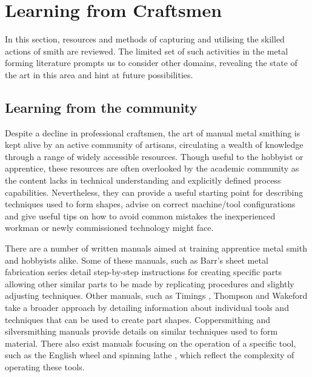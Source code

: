 \newpage
\section{Learning from Craftsmen} \label{sec:Learning}


In this section, resources and methods of capturing and utilising the skilled actions of smith are reviewed. The limited set of such activities in the metal forming literature prompts us to consider other domains, revealing the state of the art in this area and hint at future possibilities. 

\subsection{Learning from the community \label{sec:LfC}}
Despite a decline in professional craftsmen, the art of manual metal smithing is kept alive by an active community of artisans, circulating a wealth of knowledge through a range of widely accessible resources. Though useful to the hobbyist or apprentice, these resources are often overlooked by the academic community as the content lacks in technical understanding and explicitly defined process capabilities. Nevertheless, they can provide a useful starting point for describing techniques used to form shapes, advise on correct machine/tool configurations and give useful tips on how to avoid common mistakes the inexperienced workman or newly commissioned technology might face.

There are a number of written manuals aimed at training apprentice metal smith and hobbyists alike. Some of these manuals, such as Barr's sheet metal fabrication series \citep{Barr2013ProfessionalFabrication,Barr2019SheetProjects} detail step-by-step instructions for creating specific parts allowing other similar parts to be made by replicating procedures and slightly adjusting techniques. Other manuals, such as Timings \citep{Timings2008SheetMetalwork}, Thompson \citep{Thompson2007ManufacturingProfessionals} and Wakeford \citep{Wakeford1985SheetWork} take a broader approach by detailing information about individual tools and techniques that can be used to create part shapes. Coppersmithing \citep{Fuller1904ArtForms} and silversmithing \citep{Hill2014ManufacturingProcesses} manuals provide details on similar techniques used to form material. There also exist manuals focusing on the operation of a specific tool, such as the English wheel \citep{Longyard2014LearningWheel} and spinning lathe \citep{Tuells1912MetalUsed}, which reflect the complexity of operating these tools.

